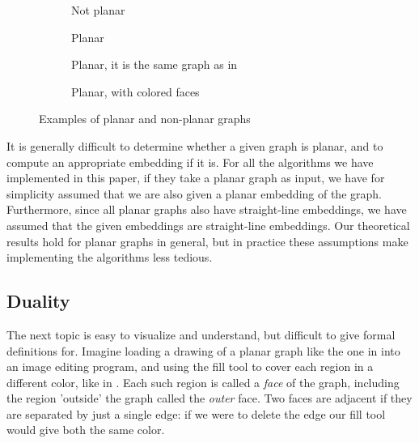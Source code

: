 \begin{figure}
    \centering
    \begin{subfigure}{.23\textwidth}
        \centering
        
        \caption{Not planar}
        \label{subfigure:k33}
    \end{subfigure}\hfill%
    \begin{subfigure}{.23\textwidth}
        \centering
        
        \caption{Planar}
        \label{subfigure:k4-a}
    \end{subfigure}\hfill%
    \begin{subfigure}{.23\textwidth}
        \centering
        
        \caption{Planar, it is the same graph as in }
        \label{subfigure:k4-b}
    \end{subfigure}\hfill%
    \begin{subfigure}{.23\textwidth}
        \centering
        
        \caption{Planar, with colored faces}
        \label{subfigure:k4-c}
    \end{subfigure}
    \caption{Examples of planar and non-planar graphs}
\end{figure}

It is generally difficult to determine whether a given graph is planar, and to compute an appropriate embedding if it is. For all the algorithms we have implemented in this paper, if they take a planar graph as input, we have for simplicity assumed that we are also given a planar embedding of the graph. Furthermore, since all planar graphs also have straight-line embeddings, we have assumed that the given embeddings are straight-line embeddings. Our theoretical results hold for planar graphs in general, but in practice these assumptions make implementing the algorithms less tedious.

\subsection{Duality}
The next topic is easy to visualize and understand, but difficult to give formal definitions for. Imagine loading a drawing of a planar graph like the one in  into an image editing program, and using the fill tool to cover each region in a different color, like in . Each such region is called a \emph{face} of the graph, including the region 'outside' the graph called the \emph{outer} face. Two faces are adjacent if they are separated by just a single edge: if we were to delete the edge our fill tool would give both the same color.

